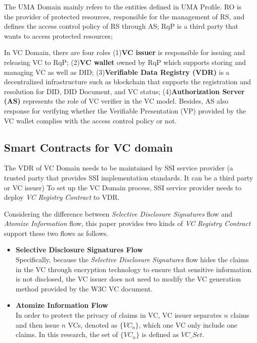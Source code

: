 \documentclass[conference, dvipdfmx]{IEEEtran} %
\begin{document}
\begin{sloppypar}
The UMA Domain mainly refers to the entities defined in UMA Profile\cite{UMA}.
RO is the provider of protected resources, responsible for the management of RS, and defines the access control policy of RS through AS;
RqP is a third party that wants to access protected resources; 

In VC Domain, there are four roles (1)\textbf{VC issuer} is responsible for issuing and releasing VC to RqP; (2)\textbf{VC wallet} owned by RqP which supports storing and managing VC as well as DID; (3)\textbf{Verifiable Data Registry (VDR)} is a decentralized infrastructure such as blockchain that supports the registration and resolution for DID, DID Document, and VC status; (4)\textbf{Authorization Server (AS)}  represents the role of VC verifier in the VC model. Besides, AS also response for verifying whether the Verifiable Presentation (VP) provided by the VC wallet complies with the access control policy or not.

\subsection{Smart Contracts for VC domain}
The VDR of VC Domain needs to be maintained by SSI service provider (a trusted party that provides SSI implementation standards. It can be a third party or VC issuer) To set up the VC Domain process, SSI service provider needs to deploy \textit{VC Registry Contract} to VDR.

Considering the difference between \textit{Selective Disclosure Signatures} flow and \textit{Atomize Information} flow, this paper provides two kinds of \textit{VC Registry Contract} support these two flows as follows.
\begin{itemize}
  \item 	\textbf{Selective Disclosure Signatures Flow}\\
  Specifically, because the \textit{Selective Disclosure Signatures} flow hides the claims in the VC through encryption technology to ensure that sensitive information is not disclosed, the VC issuer does not need to modify the VC generation method provided by the W3C VC document.
  \item \textbf{Atomize Information Flow}\\
  In order to protect the privacy of claims in VC, VC issuer separates $n$ claims and then issue $n$ VCs, denoted as $\{VC_n\}$,  which one VC only include one claims. In this research, the set of $\{VC_n\}$ is defined as $VC\_Set$.
\end{itemize}


\end{sloppypar}
\end{document}
